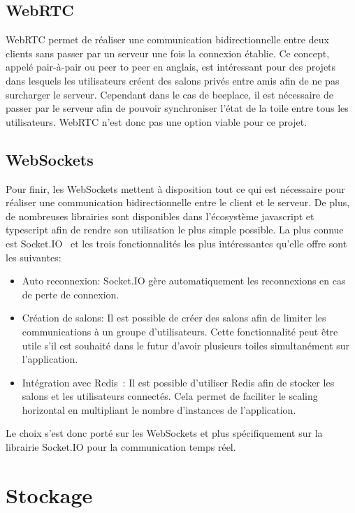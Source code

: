 \subsection{WebRTC}
WebRTC permet de réaliser une communication bidirectionnelle entre deux clients sans passer par un serveur une fois la connexion établie. Ce concept, appelé pair-à-pair ou peer to peer en anglais, est intéressant pour des projets dans lesquels les utilisateurs créent des salons privés entre amis afin de ne pas surcharger le serveur. Cependant dans le cas de \gls{beeplace}, il est nécessaire de passer par le serveur afin de pouvoir synchroniser l'état de la toile entre tous les utilisateurs. WebRTC n'est donc pas une option viable pour ce projet.

\subsection{WebSockets}
Pour finir, les WebSockets mettent à disposition tout ce qui est nécessaire pour réaliser une communication bidirectionnelle entre le client et le serveur. De plus, de nombreuses librairies sont disponibles dans l'écosystème \gls{javascript} et \gls{typescript} afin de rendre son utilisation le plus simple possible. La plus connue est Socket.IO~\cite{socket-io} et les trois fonctionnalités les plus intéressantes qu'elle offre sont les suivantes:

\begin{itemize}
  \item Auto reconnexion: Socket.IO gère automatiquement les reconnexions en cas de perte de connexion.
  \item Création de salons: Il est possible de créer des salons afin de limiter les communications à un groupe d'utilisateurs. Cette fonctionnalité peut être utile s'il est souhaité dans le futur d'avoir plusieurs toiles simultanément sur l'application.
  \item Intégration avec Redis~\cite{redis}: Il est possible d'utiliser Redis afin de stocker les salons et les utilisateurs connectés. Cela permet de faciliter le scaling horizontal en multipliant le nombre d'instances de l'application.
\end{itemize}

Le choix s'est donc porté sur les WebSockets et plus spécifiquement sur la librairie Socket.IO pour la communication temps réel.

\section{Stockage}

